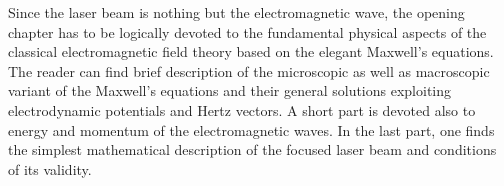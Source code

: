 Since the laser beam is nothing but the electromagnetic wave, the opening chapter has to be logically devoted to the fundamental physical aspects of the classical electromagnetic field theory based on the elegant Maxwell's equations. The reader can find brief description of the microscopic as well as macroscopic variant of the Maxwell's equations and their general solutions exploiting electrodynamic potentials and Hertz vectors. A short part is devoted also to energy and momentum of the electromagnetic waves. In the last part, one finds the simplest mathematical description of the focused laser beam and conditions of its validity.